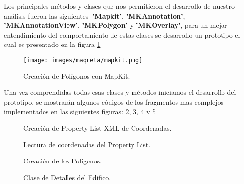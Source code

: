 Los principales  métodos y clases que nos permitieron el desarrollo de nuestro análisis fueron las siguientes: \textbf{'Mapkit'}, \textbf{'MKAnnotation'}, \textbf{'MKAnnotationView'}, \textbf{'MKPolygon'} y \textbf{'MKOverlay'}, para un mejor entendimiento del comportamiento de estas clases se desarrollo un prototipo el cual es presentado en la figura \ref{mapkit}\\
\begin{figure}[h!]
	\begin{center}
		\texttt{[image: images/maqueta/mapkit.png]}
		\caption{Creación de Polígonos con MapKit.}
		\label{mapkit}
	\end{center}
\end{figure}

Una vez comprendidas todas esas clases y métodos iniciamos el desarrollo del prototipo, se mostrarán algunos códigos de los fragmentos mas complejos implementados en las siguientes figuras: \ref{plist}, \ref{edificioplist}, \ref{poligono} y \ref{detalleedificio}\\

\begin{figure}[h!]
	\begin{center}
		\caption{Creación de Property List XML de Coordenadas.}
		\label{plist}
	\end{center}
\end{figure}
\begin{figure}[h!]
	\begin{center}
		\caption{Lectura de coordenadas del Property List.}
		\label{edificioplist}
	\end{center}
\end{figure}
\begin{figure}[h!]
	\begin{center}
		\caption{Creación de los Polígonos.}
		\label{poligono}
	\end{center}
\end{figure}
\begin{figure}[h!]
	\begin{center}
		\caption{Clase de Detalles del Edifico.}
		\label{detalleedificio}
	\end{center}
\end{figure}

